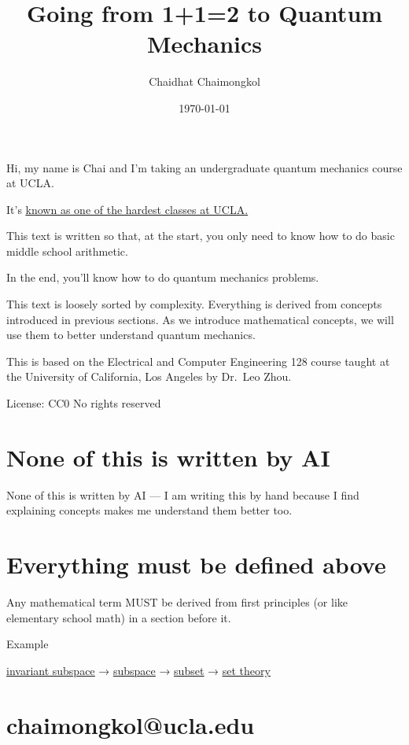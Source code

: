 \documentclass[
]{article}
\author{}
\date{}
\title{Going from 1+1=2 to Quantum Mechanics}
\author{Chaidhat Chaimongkol}
\date{\today}
\let\oldhyperref\hyperref
\renewcommand{\hyperref}[2][]{\oldhyperref[#1]{\underline{#2}}}
\begin{document}
\maketitle


Hi, my name is Chai and I'm taking an undergraduate quantum mechanics course at UCLA.
\bigskip

It's \underline{\href{https://www.reddit.com/r/ucla/comments/1lhbq9z/ece_128_hardest_class_at_ucla/}{known as one of the hardest classes at UCLA}.}
\bigskip

This text is written so that, at the start, you only need to know how to do basic middle school arithmetic.
\bigskip

In the end, you'll know how to do quantum mechanics problems.
\bigskip

This text is loosely sorted by complexity. Everything is derived from concepts introduced in previous sections. As we introduce mathematical concepts, we will use them to better understand quantum mechanics.
\bigskip

This is based on the Electrical and Computer Engineering 128 course
taught at the University of California, Los Angeles by Dr.~Leo Zhou.

License: CC0 No rights reserved



\section*{None of this is written by
	AI}\label{none-of-this-is-written-by-ai}

None of this is written by AI --- I am writing this by hand because I
find explaining concepts makes me understand them better too.

\section*{Everything must be defined
	above}\label{everything-must-be-defined-above}

Any mathematical term MUST be derived from first principles (or like
elementary school math) in a section before it.

Example

\hyperref[invariant-subspaces]{invariant
	subspace} →
\hyperref[subspaces]{subspace}
→
\hyperref[subsets]{subset}
→
\hyperref[set-theory]{set
	theory}


\section*{chaimongkol@ucla.edu}
\end{document}
